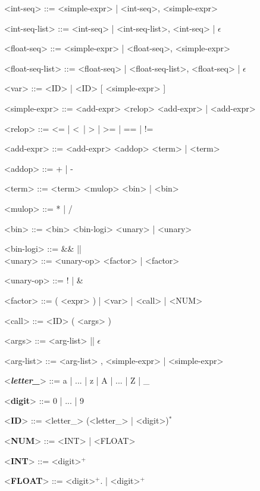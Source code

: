 \begin{grammar}
	<int-seq> ::= <simple-expr> | <int-seq>, <simple-expr>
	
	<int-seq-list> ::= {<int-seq>} | <int-seq-list>, {<int-seq>} | $\epsilon$

	<float-seq> ::= <simple-expr> | <float-seq>, <simple-expr>
		
	<float-seq-list> ::= {<float-seq>} | <float-seq-list>, {<float-seq>} | $\epsilon$
	
	<var> ::= <ID> | <ID> [ <simple-expr> ]
	
	<simple-expr> ::= <add-expr> <relop> <add-expr> | <add-expr>
	
	<relop> ::= \textless= | \textless\ | > | >= | == | !=
	
	<add-expr> ::= <add-expr> <addop> <term> | <term>
	
	<addop> ::= + | - 
	
	<term> ::= <term> <mulop> <bin> | <bin>
	
	<mulop> ::= * | / 
	
	<bin> ::= <bin> <bin-logi> <unary> | <unary>
	
	<bin-logi> ::= \&\& \alt || \alt \^ \\
	
	<unary> ::= <unary-op> <factor> | <factor> 
	
	<unary-op> ::= ! | \&
	
	<factor> ::= ( <expr> ) | <var> | <call> | <NUM>
	
	<call> ::= <ID> ( <args> ) 
	
	<args> ::= <arg-list> || $\epsilon$
	
	<arg-list> ::= <arg-list> , <simple-expr> | <simple-expr>
	
	<\textbf{\textit{letter\_}}> ::= a | ... | z | A | ... | Z | \_
	
	<\textbf{digit}> ::= 0 | ... | 9
	
	<\textbf{ID}> ::= <letter\_> (<letter\_> | <digit>)$^*$
	
	<\textbf{NUM}> ::= <INT> | <FLOAT>
	
	<\textbf{INT}> ::= <digit>$^+$
	
	<\textbf{FLOAT}> ::= <digit>$^+$. | <digit>$^+$
	
\end{grammar}
